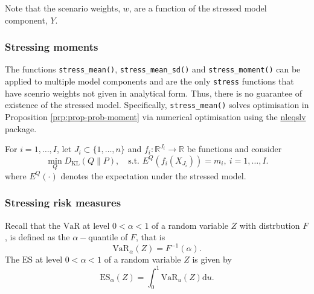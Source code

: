 \documentclass[]{article}
\theoremstyle{definition}
\theoremstyle{definition}
\theoremstyle{definition}
\theoremstyle{remark}
\let\BeginKnitrBlock\begin \let\EndKnitrBlock\end
\begin{document}
Note that the scenario weights, \(w\), are a function of the stressed model component, \(Y\).

\hypertarget{stressing-moments}{%
\subsubsection{Stressing moments}\label{stressing-moments}}

The functions \texttt{stress\_mean()}, \texttt{stress\_mean\_sd()} and \texttt{stress\_moment()} can be applied to multiple model components and are the only \texttt{stress} functions that have scenrio weights not given in analytical form. Thus, there is no guarantee of existence of the stressed model. Specifically, \texttt{stress\_mean()} solves optimisation in Proposition \ref{prp:prop-prob-moment} via numerical optimisation using the \href{https://CRAN.R-project.org/package=nleqslv}{nleqslv} package.

\BeginKnitrBlock{proposition}
\protect\hypertarget{prp:prop-prob-moment}{}{\label{prp:prop-prob-moment} }For \(i = 1, \ldots, I\), let \(J_i \subset \{1, \ldots, n\}\) and \(f_i \colon \mathbb{R}^{J_i} \to \mathbb{R}\) be functions and consider
\begin{equation} 
\min_{Q} D_\text{KL}(Q \| P), \quad
\text{s.t. } E^Q(f_i(X_{J_i}) ) = m_i, ~i = 1, \ldots, I.
\end{equation}
where \(E^Q(\cdot)\) denotes the expectation under the stressed model.
\EndKnitrBlock{proposition}

\hypertarget{stressing-risk-measures}{%
\subsubsection{Stressing risk measures}\label{stressing-risk-measures}}

Recall that the \(\text{VaR}\) at level \(0 < \alpha < 1\) of a random variable \(Z\) with distrbution \(F\), is defined as the \(\alpha-\)quantile of \(F\), that is \[\text{VaR}_\alpha(Z) = F^{-1}(\alpha).\] The \(\text{ES}\) at level \(0 < \alpha < 1\) of a random variable \(Z\) is given by \[\text{ES}_\alpha(Z) = \int_0^1 \text{VaR}_u(Z) \mathrm{d}u.\]
\end{document}
